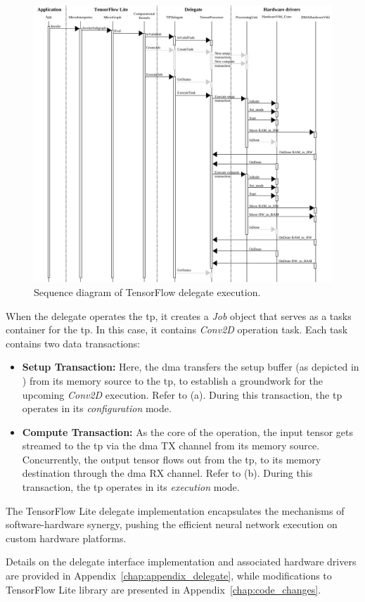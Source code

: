 \begin{figure}[h!]
	\centering
	\includegraphics[width=\textwidth]{./figures/sequence_tfl_delegate_acceleration.pdf}
	\caption{Sequence diagram of TensorFlow delegate execution.}
	\label{fig:sw_tf_delegate_execution_diagram}
\end{figure}

When the delegate operates the \gls{tp}, it creates a \textit{Job} object that serves as a tasks container for the \gls{tp}. In this case, it contains \textit{Conv2D} operation task. Each task contains two data transactions:

\begin{itemize}
	\item \textbf{Setup Transaction:} Here, the \gls{dma} transfers the setup buffer (as depicted in ) from its memory source to the \gls{tp}, to establish a groundwork for the upcoming \textit{Conv2D} execution. Refer to (a). During this transaction, the \gls{tp} operates in its \textit{configuration} mode.
	\item \textbf{Compute Transaction:} As the core of the operation, the input tensor gets streamed to the \gls{tp} via the \gls{dma} TX channel from its memory source. Concurrently, the output tensor flows out from the \gls{tp}, to its memory destination through the \gls{dma} RX channel. Refer to (b). During this transaction, the \gls{tp} operates in its \textit{execution} mode.
\end{itemize}

The TensorFlow Lite delegate implementation encapsulates the mechanisms of software-hardware synergy, pushing the efficient neural network execution on custom hardware platforms.

Details on the delegate interface implementation and associated hardware drivers are provided in Appendix~\ref{chap:appendix_delegate}, while modifications to TensorFlow Lite library are presented in Appendix~\ref{chap:code_changes}.
\FloatBarrier
